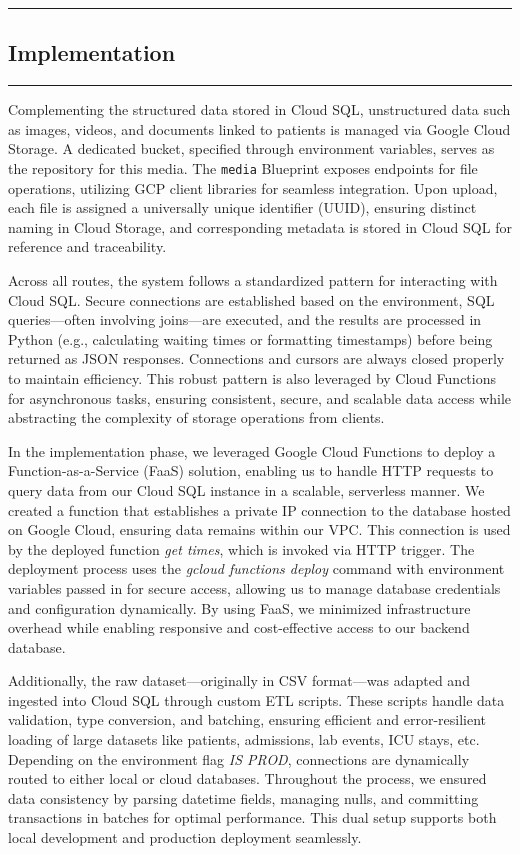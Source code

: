 {\color{gray}\hrule}
\begin{center}
\section{Implementation}
\bigskip
\end{center}
{\color{gray}\hrule}
\begin{multicols}{2}

Complementing the structured data stored in Cloud SQL, unstructured data such as images, videos, and documents linked to patients is managed via Google Cloud Storage. A dedicated bucket, specified through environment variables, serves as the repository for this media. The \texttt{media} Blueprint exposes endpoints for file operations, utilizing GCP client libraries for seamless integration. Upon upload, each file is assigned a universally unique identifier (UUID), ensuring distinct naming in Cloud Storage, and corresponding metadata is stored in Cloud SQL for reference and traceability.

Across all routes, the system follows a standardized pattern for interacting with Cloud SQL. Secure connections are established based on the environment, SQL queries—often involving joins—are executed, and the results are processed in Python (e.g., calculating waiting times or formatting timestamps) before being returned as JSON responses. Connections and cursors are always closed properly to maintain efficiency. This robust pattern is also leveraged by Cloud Functions for asynchronous tasks, ensuring consistent, secure, and scalable data access while abstracting the complexity of storage operations from clients.

In the implementation phase, we leveraged Google Cloud Functions to deploy a Function-as-a-Service (FaaS) solution, enabling us to handle HTTP requests to query data from our Cloud SQL instance in a scalable, serverless manner.  We created a function that establishes a private IP connection to the database hosted on Google Cloud, ensuring data remains within our VPC. This connection is used by the deployed function \textit{get times}, which is invoked via HTTP trigger. The deployment process uses the \textit{gcloud functions deploy} command with environment variables passed in for secure access, allowing us to manage database credentials and configuration dynamically. By using FaaS, we minimized infrastructure overhead while enabling responsive and cost-effective access to our backend database.


Additionally, the raw dataset—originally in CSV format—was adapted and ingested into Cloud SQL through custom ETL scripts. These scripts handle data validation, type conversion, and batching, ensuring efficient and error-resilient loading of large datasets like patients, admissions, lab events, ICU stays, etc. Depending on the environment flag \textit{IS PROD}, connections are dynamically routed to either local or cloud databases. Throughout the process, we ensured data consistency by parsing datetime fields, managing nulls, and committing transactions in batches for optimal performance. This dual setup supports both local development and production deployment seamlessly.

\end{multicols}


